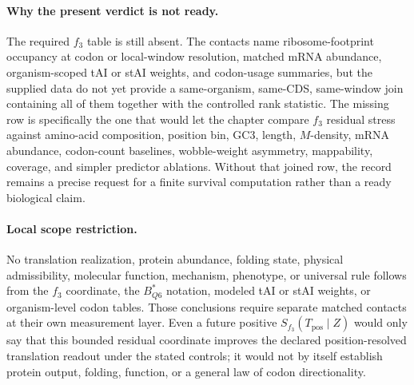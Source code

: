\paragraph{Why the present verdict is not ready.}
The required $f_3$ table is still absent.  The contacts name ribosome-footprint occupancy at codon or local-window resolution, matched mRNA abundance, organism-scoped tAI or stAI weights, and codon-usage summaries, but the supplied data do not yet provide a same-organism, same-CDS, same-window join containing all of them together with the controlled rank statistic.  The missing row is specifically the one that would let the chapter compare $f_3$ residual stress against amino-acid composition, position bin, GC3, length, $M$-density, mRNA abundance, codon-count baselines, wobble-weight asymmetry, mappability, coverage, and simpler predictor ablations.  Without that joined row, the record remains a precise request for a finite survival computation rather than a ready biological claim.

\paragraph{Local scope restriction.}
No translation realization, protein abundance, folding state, physical admissibility, molecular function, mechanism, phenotype, or universal rule follows from the $f_3$ coordinate, the $B^*_{Q6}$ notation, modeled tAI or stAI weights, or organism-level codon tables.  Those conclusions require separate matched contacts at their own measurement layer.  Even a future positive $S_{f_3}(T_{\mathrm{pos}}\mid Z)$ would only say that this bounded residual coordinate improves the declared position-resolved translation readout under the stated controls; it would not by itself establish protein output, folding, function, or a general law of codon directionality.
